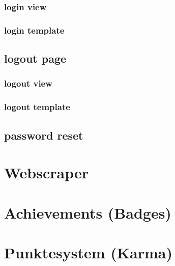 \subsubsection{login view}
\subsubsection{login template}

\subsection{logout page}
\subsubsection{logout view}
\subsubsection{logout template}

\subsection{password reset}

\section{Webscraper}

\section{Achievements (Badges)} \label{spez:Badges}
\section{Punktesystem (Karma)}
